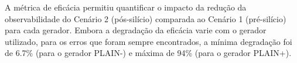 %
%
%

A métrica de eficácia permitiu quantificar o impacto da redução da
observabilidade do Cenário 2 (pós-silício) comparada ao Cenário 1 (pré-silício)
para cada gerador. Embora a degradação da eficácia varie com o gerador
utilizado, para os erros que foram sempre encontrados, a mínima degradação foi
de 6.7\% (para o gerador PLAIN-) e máxima de 94\% (para o gerador PLAIN+).

